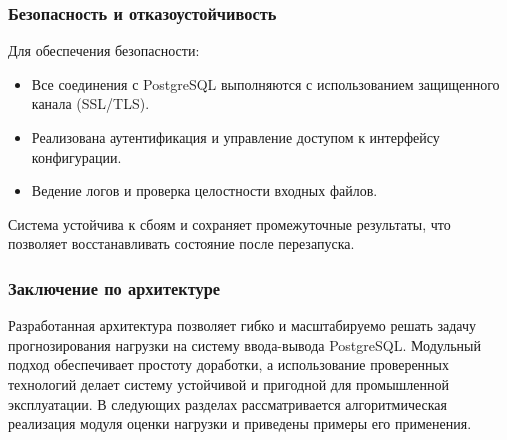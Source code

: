\subsubsection{Безопасность и отказоустойчивость}

Для обеспечения безопасности:

\begin{itemize}
\item Все соединения с PostgreSQL выполняются с использованием защищенного канала (SSL/TLS).
\item Реализована аутентификация и управление доступом к интерфейсу конфигурации.
\item Ведение логов и проверка целостности входных файлов.
\end{itemize}

Система устойчива к сбоям и сохраняет промежуточные результаты, что позволяет восстанавливать состояние после перезапуска.

\subsubsection{Заключение по архитектуре}

Разработанная архитектура позволяет гибко и масштабируемо решать задачу прогнозирования нагрузки на систему ввода-вывода PostgreSQL. Модульный подход обеспечивает простоту доработки, а использование проверенных технологий делает систему устойчивой и пригодной для промышленной эксплуатации. В следующих разделах рассматривается алгоритмическая реализация модуля оценки нагрузки и приведены примеры его применения.
